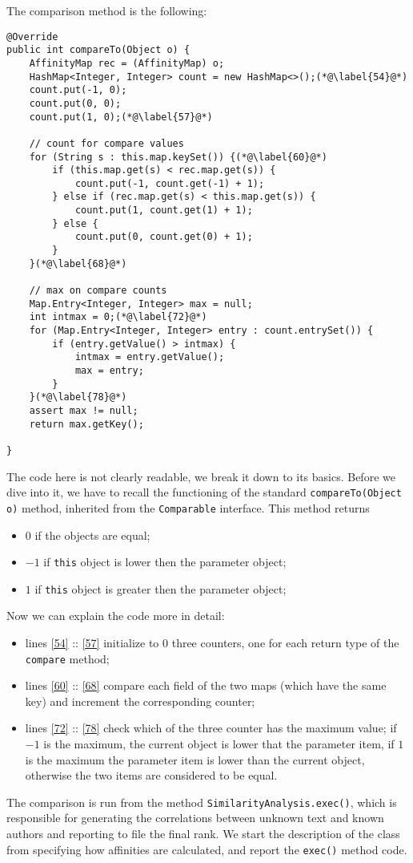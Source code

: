\documentclass[a4paper,11pt, twoside]{article}
\begin{document}
	 The comparison method is the following:\begin{lstlisting}[firstnumber=51,caption={AffinityMap comparison method}, captionpos=b, label={lst:comparemethod}]
@Override
public int compareTo(Object o) {
	AffinityMap rec = (AffinityMap) o;
	HashMap<Integer, Integer> count = new HashMap<>();(*@\label{54}@*)
	count.put(-1, 0);
	count.put(0, 0);
	count.put(1, 0);(*@\label{57}@*)
	
	// count for compare values
	for (String s : this.map.keySet()) {(*@\label{60}@*)
		if (this.map.get(s) < rec.map.get(s)) {
			count.put(-1, count.get(-1) + 1);
		} else if (rec.map.get(s) < this.map.get(s)) {
			count.put(1, count.get(1) + 1);
		} else {
			count.put(0, count.get(0) + 1);
		}
	}(*@\label{68}@*)
	
	// max on compare counts
	Map.Entry<Integer, Integer> max = null;
	int intmax = 0;(*@\label{72}@*)
	for (Map.Entry<Integer, Integer> entry : count.entrySet()) {
		if (entry.getValue() > intmax) {
			intmax = entry.getValue();
			max = entry;
		}
	}(*@\label{78}@*)
	assert max != null;
	return max.getKey();

}
	 \end{lstlisting}
	 
	 The code here is not clearly readable, we break it down to its basics. Before we dive into it, we have to recall the functioning of the standard \lstinline|compareTo(Object o)| method, inherited from the \lstinline|Comparable| interface. This method returns \begin{itemize}
	 	\item $0$ if the objects are equal;
	 	\item $-1$ if \lstinline|this| object is lower then the parameter object;
	 	\item $1$ if \lstinline|this| object is greater then the parameter object;
	 \end{itemize}
 
 	Now we can explain the code more in detail: \begin{itemize}
 		\item lines \ref{54} :: \ref{57} initialize to 0 three counters, one for each return type of the \lstinline|compare| method;
 		\item lines \ref{60} :: \ref{68} compare each field of the two maps (which have the same key) and increment the corresponding counter;
 		\item lines \ref{72} :: \ref{78} check which of the three counter has the maximum value; if $-1$ is the maximum, the current object is lower that the parameter item, if $1$ is the maximum the parameter item is lower than the current object, otherwise the two items are considered to be equal.
 	\end{itemize}
 	The comparison is run from the method \lstinline|SimilarityAnalysis.exec()|, which is responsible for generating the correlations between unknown text and known authors and reporting to file the final rank. We start the description of the class from specifying how affinities are calculated, and report the \lstinline|exec()| method code.
 	
\end{document}

